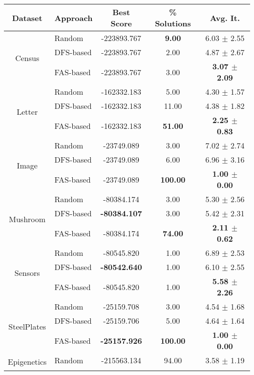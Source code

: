 	\begin{table}[ h ]
		\centering
		\begin{tabular}{|c|l|c|c|c|}
			\hline
			Dataset & Approach & Best Score & \% Solutions & Avg. It. \\ \hline
			\multirow{3}{*}{Census} & Random & -223893.767 & \textbf{9.00} & 6.03 $\pm$ 2.55 \\ \cline{2-5} 
					& DFS-based & -223893.767 & 2.00 & 4.87 $\pm$ 2.67 \\ \cline{2-5}
					& FAS-based & -223893.767 & 3.00 & \textbf{3.07 $\pm$ 2.09} \\ \hline
			\multirow{3}{*}{Letter} & Random & -162332.183 & 5.00 & 4.30 $\pm$ 1.57 \\ \cline{2-5} 
					& DFS-based & -162332.183 & 11.00 & 4.38 $\pm$ 1.82 \\ \cline{2-5}
					& FAS-based & -162332.183 & \textbf{51.00} & \textbf{2.25 $\pm$ 0.83} \\ \hline
			\multirow{3}{*}{Image} & Random & -23749.089 & 3.00 & 7.02 $\pm$ 2.74 \\ \cline{2-5} 
					& DFS-based & -23749.089 & 6.00 & 6.96 $\pm$ 3.16 \\ \cline{2-5}
					& FAS-based & -23749.089 & \textbf{100.00} & \textbf{1.00 $\pm$ 0.00} \\ \hline
			\multirow{3}{*}{Mushroom} & Random & -80384.174 & 3.00 & 5.30 $\pm$ 2.56 \\ \cline{2-5} 
					& DFS-based & \textbf{-80384.107} & 3.00 & 5.42 $\pm$ 2.31 \\ \cline{2-5}
					& FAS-based & -80384.174 & \textbf{74.00} & \textbf{2.11 $\pm$ 0.62} \\ \hline
			\multirow{3}{*}{Sensors} & Random & -80545.820 & 1.00 & 6.89 $\pm$ 2.53 \\ \cline{2-5} 
					& DFS-based & \textbf{-80542.640} & 1.00 & 6.10 $\pm$ 2.55 \\ \cline{2-5}
					& FAS-based & -80545.820 & 1.00 & \textbf{5.58 $\pm$ 2.26} \\ \hline
			\multirow{3}{*}{SteelPlates} & Random & -25159.708 & 3.00 & 4.54 $\pm$ 1.68 \\ \cline{2-5} 
					& DFS-based & -25159.706 & 5.00 & 4.64 $\pm$ 1.64 \\ \cline{2-5}
					& FAS-based & \textbf{-25157.926} & \textbf{100.00} & \textbf{1.00 $\pm$ 0.00} \\ \hline
			\multirow{3}{*}{Epigenetics} & Random & -215563.134 & 94.00 & 3.58 $\pm$ 1.19 \\ \cline{2-5} 

\end{tabular}
\end{table}
